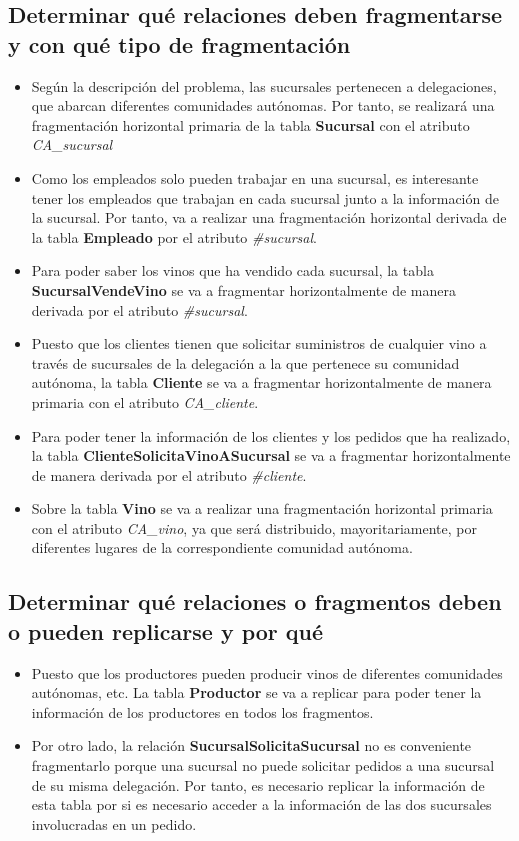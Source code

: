 \documentclass[paper=a4, fontsize=12pt]{article} %
\numberwithin{equation}{section} %
\numberwithin{figure}{section} %
\numberwithin{table}{section} %
\begin{document}
\subsection {Determinar qué relaciones deben fragmentarse y con qué tipo de fragmentación}
\begin{itemize}
\item Según la descripción del problema, las sucursales pertenecen a delegaciones, que abarcan diferentes comunidades autónomas. Por tanto, se realizará una fragmentación horizontal primaria de la tabla \textbf{Sucursal} con el atributo \textit{CA\_sucursal}
\item Como los empleados solo pueden trabajar en una sucursal, es interesante tener los empleados que trabajan en cada sucursal junto a la información de la sucursal. Por tanto, va a realizar una fragmentación horizontal derivada de la tabla \textbf{Empleado} por el atributo \textit{\#sucursal}.
\item Para poder saber los vinos que ha vendido cada sucursal, la tabla \textbf{SucursalVendeVino} se va a fragmentar horizontalmente de manera derivada por el atributo \textit{\#sucursal}.
\item Puesto que los clientes tienen que solicitar suministros de cualquier vino a través de sucursales de la delegación a la que pertenece su comunidad autónoma, la tabla \textbf{Cliente} se va a fragmentar horizontalmente de manera primaria con el atributo \textit{CA\_cliente}.
\item Para poder tener la información de los clientes y los pedidos que ha realizado, la tabla \textbf{ClienteSolicitaVinoASucursal} se va a fragmentar horizontalmente de manera derivada por el atributo \textit{\#cliente}.
\item Sobre la tabla \textbf{Vino} se va a realizar una fragmentación horizontal primaria con el atributo \textit{CA\_vino}, ya que será distribuido, mayoritariamente, por diferentes lugares de la correspondiente comunidad autónoma.
\end{itemize}

\subsection {Determinar qué relaciones o fragmentos deben o pueden replicarse y por qué}
\begin{itemize}
\item Puesto que los productores pueden producir vinos de diferentes comunidades autónomas, etc. La tabla \textbf{Productor} se va a replicar para poder tener la información de los productores en todos los fragmentos.
\item Por otro lado, la relación \textbf{SucursalSolicitaSucursal} no es conveniente fragmentarlo porque una sucursal no puede solicitar pedidos a una sucursal de su misma delegación. Por tanto, es necesario replicar la información de esta tabla por si es necesario acceder a la información de las dos sucursales involucradas en un pedido.
\end{itemize}
\end{document}
